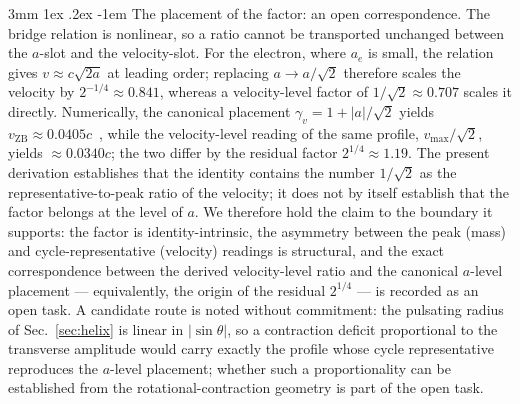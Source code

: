 \documentclass[%
 reprint, amsmath,amssymb, aps, prb, ]{revtex4-2}
\makeatletter
\numberwithin{equation}{section}
\renewcommand\paragraph{%
  \@startsection{paragraph}{4}{\z@}%
    {3mm \@plus 1ex \@minus .2ex}%
    {-1em}%
    {\normalfont\normalsize\itshape}}
\newcommand{\vZB}{v_{\text{ZB}}}
\makeatother
\begin{document}
\paragraph{The placement of the factor: an open correspondence.}
The bridge relation is nonlinear, so a ratio cannot be transported unchanged between the $a$-slot and the velocity-slot. For the electron, where $a_e$ is small, the relation gives $v \approx c\sqrt{2a}$ at leading order; replacing $a \to a/\sqrt{2}$ therefore scales the velocity by $2^{-1/4} \approx 0.841$, whereas a velocity-level factor of $1/\sqrt{2} \approx 0.707$ scales it directly. Numerically, the canonical placement $\gamma_v = 1+\lvert a\rvert/\sqrt{2}$ yields $\vZB \approx 0.0405c$~\cite{hanamura10}, while the velocity-level reading of the same profile, $v_{\max}/\sqrt{2}$, yields $\approx 0.0340c$; the two differ by the residual factor $2^{1/4} \approx 1.19$. The present derivation establishes that the identity contains the number $1/\sqrt{2}$ as the representative-to-peak ratio of the velocity; it does not by itself establish that the factor belongs at the level of $a$. We therefore hold the claim to the boundary it supports: the factor is identity-intrinsic, the asymmetry between the peak (mass) and cycle-representative (velocity) readings is structural, and the exact correspondence between the derived velocity-level ratio and the canonical $a$-level placement --- equivalently, the origin of the residual $2^{1/4}$ --- is recorded as an open task. A candidate route is noted without commitment: the pulsating radius of Sec.~\ref{sec:helix} is linear in $\lvert\sin\theta\rvert$, so a contraction deficit proportional to the transverse amplitude would carry exactly the profile whose cycle representative reproduces the $a$-level placement; whether such a proportionality can be established from the rotational-contraction geometry is part of the open task.
\end{document}
